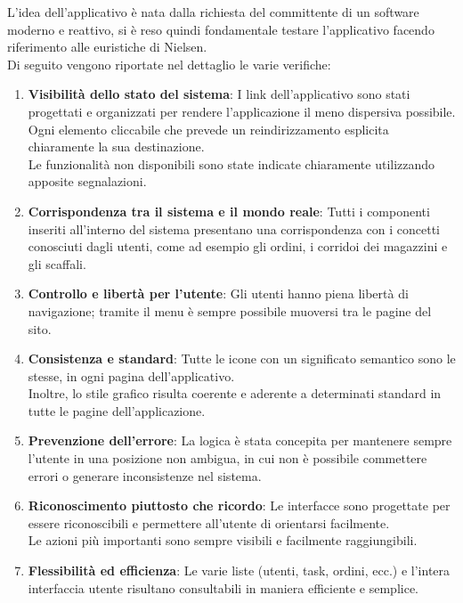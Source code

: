 L'idea dell'applicativo è nata dalla richiesta del committente di un software moderno e reattivo, si è reso
quindi fondamentale testare l'applicativo facendo riferimento alle euristiche di Nielsen.\\ Di seguito vengono riportate nel dettaglio le varie verifiche:
\begin{enumerate}
    \item \textbf{Visibilità dello stato del sistema}: I link dell’applicativo sono stati progettati e organizzati per rendere l’applicazione il meno dispersiva possibile.\\ Ogni elemento cliccabile che prevede un reindirizzamento esplicita chiaramente la sua destinazione.\\ Le funzionalità non disponibili sono state indicate chiaramente utilizzando apposite segnalazioni.

    \item \textbf{Corrispondenza tra il sistema e il mondo reale}: Tutti i componenti inseriti all’interno del sistema presentano una corrispondenza con i concetti conosciuti dagli utenti, come ad esempio gli ordini, i corridoi dei magazzini e gli scaffali.

    \item \textbf{Controllo e libertà per l’utente}: Gli utenti hanno piena libertà di navigazione; tramite il menu è sempre possibile muoversi tra le pagine del sito.

    \item \textbf{Consistenza e standard}: Tutte le icone con un significato semantico sono le stesse, in ogni pagina dell’applicativo.\\ Inoltre, lo stile grafico risulta coerente e aderente a determinati standard in tutte le pagine dell’applicazione.

    \item \textbf{Prevenzione dell’errore}: La logica è stata concepita per mantenere sempre l’utente in una posizione non ambigua, in cui non è possibile commettere errori o generare inconsistenze nel sistema.

    \item \textbf{Riconoscimento piuttosto che ricordo}: Le interfacce sono progettate per essere riconoscibili e permettere all’utente di orientarsi facilmente.\\ Le azioni più importanti sono sempre visibili e facilmente raggiungibili.

    \item \textbf{Flessibilità ed efficienza}: Le varie liste (utenti, task, ordini, ecc.) e l’intera interfaccia utente risultano consultabili in maniera efficiente e semplice.


\end{enumerate}
